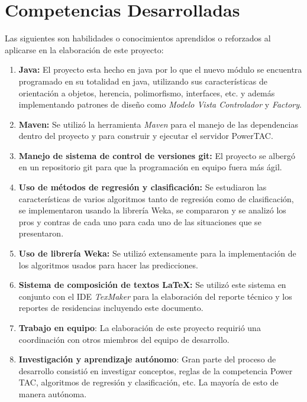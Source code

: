 \section{Competencias Desarrolladas}

Las siguientes son habilidades o conocimientos aprendidos o reforzados al aplicarse en la elaboración de este proyecto:
\begin{enumerate}
	\item \textbf{Java:} El proyecto esta hecho en java por lo que el nuevo módulo se encuentra programado en su totalidad en java, utilizando sus características de orientación a objetos,  herencia, polimorfismo, interfaces, etc. y además implementando patrones de diseño como \textit{Modelo Vista Controlador} y \textit{Factory}.
	
	\item \textbf{Maven:} Se utilizó la herramienta \textit{Maven} para el manejo de las dependencias dentro del proyecto y para construir y ejecutar el servidor PowerTAC.

	\item \textbf{Manejo de sistema de control de versiones git:} El proyecto se albergó en un repositorio git para que la programación en equipo fuera más ágil.
	
	\item \textbf{Uso de métodos de regresión y clasificación:} Se estudiaron las características de varios algoritmos tanto de regresión como de clasificación, se implementaron usando la librería Weka, se compararon y se analizó los pros y contras de cada uno para cada uno de las situaciones que se presentaron.

	\item \textbf{Uso de librería Weka:} Se utilizó extensamente para la implementación de los algoritmos usados para hacer las predicciones.

	\item \textbf{Sistema de composición de textos \LaTeX{}:} Se utilizó este sistema en conjunto con el IDE \textit{TexMaker} para la elaboración del reporte técnico y los reportes de residencias incluyendo este documento.
	
	\item \textbf{Trabajo en equipo}: La elaboración de este proyecto requirió una coordinación con otros miembros del equipo de desarrollo.
	
	\item \textbf{Investigación y aprendizaje autónomo}: Gran parte del proceso de desarrollo consistió en investigar conceptos, reglas de la competencia Power TAC, algoritmos de regresión y clasificación, etc. La mayoría de esto de manera autónoma.
	

\end{enumerate}
